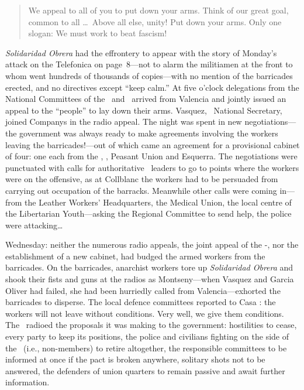 \begin{quotation}
  We appeal to all of you to put down your arms. Think of our great goal, common to all \dots\ Above all else, unity! Put down your arms. Only one slogan: We must work to beat fascism!
\end{quotation}

\emph{Solidaridad Obrera} had the effrontery to appear with the story of Monday’s attack on the Telefonica on page~8---not to alarm the militiamen at the front to whom went hundreds of thousands of copies---with no mention of the barricades erected, and no directives except ``keep calm.'' At five o’clock delegations from the National Committees of the \UGT\ and \CNT\ arrived from Valencia and jointly issued an appeal to the ``people'' to lay down their arms. Vasquez, \CNT\ National Secretary, joined Companys in the radio appeal. The night was spent in new negotiations---the government was always ready to make agreements involving the workers leaving the barricades!---out of which came an agreement for a provisional cabinet of four: one each from the \CNT, \PSUC, Peasant Union and Esquerra. The negotiations were punctuated with calls for authoritative \CNT\ leaders to go to points where the workers were on the offensive, as at Collblanc the workers had to be persuaded from carrying out occupation of the barracks. Meanwhile other calls were coming in---from the Leather Workers’ Headquarters, the Medical Union, the local centre of the Libertarian Youth---asking the Regional Committee to send help, the police were attacking\dots

Wednesday: neither the numerous radio appeals, the joint appeal of the \UGT-\CNT, nor the establishment of a new cabinet, had budged the armed workers from the barricades. On the barricades, anarchist workers tore up \emph{Solidaridad Obrera} and shook their fists and guns at the radios as Montseny---when Vasquez and Garcia Oliver had failed, she had been hurriedly called from Valencia---exhorted the barricades to disperse. The local defence committees reported to Casa \CNT: the workers will not leave without conditions. Very well, we give them conditions. The \CNT\ radioed the proposals it was making to the government: hostilities to cease, every party to keep its positions, the police and civilians fighting on the side of the \CNT\ (i.e., non-members) to retire altogether, the responsible committees to be informed at once if the pact is broken anywhere, solitary shots not to be answered, the defenders of union quarters to remain passive and await further information.

